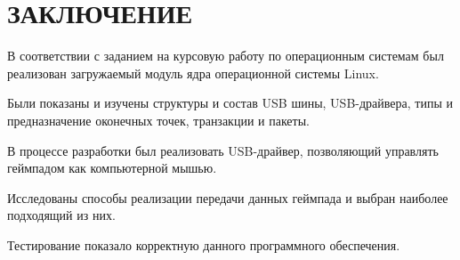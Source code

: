 \section*{ЗАКЛЮЧЕНИЕ}
В соответствии с заданием на курсовую работу по операционным системам был реализован загружаемый модуль ядра операционной системы Linux.\par
Были показаны и изучены структуры и состав USB шины, USB-драйвера, типы и предназначение оконечных точек, транзакции и пакеты.
\par 
В процессе разработки был реализовать USB-драйвер, позволяющий управлять геймпадом как компьютерной мышью.\par
Исследованы способы реализации передачи данных геймпада и выбран наиболее подходящий из них.\par
Тестирование показало корректную данного программного обеспечения. 
\pagebreak